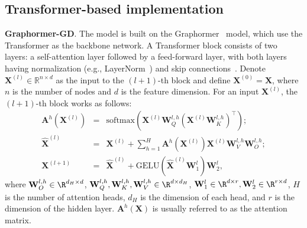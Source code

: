 \documentclass{article} %
\begin{document}


\subsection{Transformer-based implementation}
\label{sec:transformer}
\textbf{Graphormer-GD}. The model is built on the Graphormer~\citep{ying2021transformers} model, which use the Transformer \citep{vaswani2017attention} as the backbone network. A Transformer block consists of two layers: a self-attention layer followed by a feed-forward layer, with both layers having normalization (e.g., LayerNorm~\citep{ba2016layer}) and skip connections~\citep{he2016deep}. Denote $\mathbf X^{(l)}\in\mathbb{R}^{n\times d}$ as the input to the $(l+1)$-th block and define $\mathbf X^{(0)}=\mathbf X$, where $n$ is the number of nodes and $d$ is the feature dimension. For an input $\mathbf X^{(l)}$, the $(l+1)$-th block works as follows:
\begin{eqnarray}
    \label{eqn:attn-mat}
    \mathbf A^h(\mathbf X^{(l)}) &=& \mathrm{softmax}\left(\mathbf X^{(l)} \mathbf W_Q^{l,h}(\mathbf X^{(l)} \mathbf W_K^{l,h})^{\top}\right);\\
    \label{eqn:attn}
    \hat{\mathbf X}^{(l)} &=& \mathbf X^{(l)}+ \sum_{h=1}^H\mathbf A^h(\mathbf X^{(l)}) \mathbf X^{(l)} \mathbf W_V^{l,h}\mathbf W_O^{l,h};\\
    \label{eqn:ffn}
    \mathbf X^{(l+1)}&=&\hat{\mathbf X}^{(l)}+ \mathrm{GELU} (\hat{\mathbf X}^{(l)}\mathbf W_1^l)\mathbf W_2^l,
\end{eqnarray}
where $\mathbf W_O^{l,h} \in \R^{d_H \times d}$, $\mathbf W_Q^{l,h}, \mathbf W_K^{l,h}, \mathbf W_V^{l,h} \in \R^{d \times d_H}$, $\mathbf W_1^l \in \R^{d \times r}, \mathbf W_2^l \in \R^{r \times d}$, $H$ is the number of attention heads, $d_H$ is the dimension of each head, and $r$ is the dimension of the hidden layer. $\mathbf A^h(\mathbf X)$ is usually referred to as the attention matrix.
\end{document}
